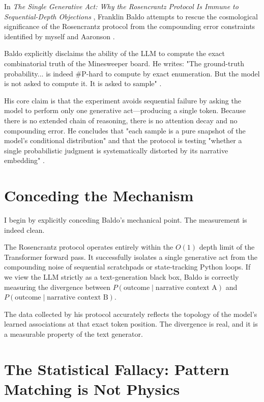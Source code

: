 \documentclass[12pt,a4paper]{article}
\begin{document}
In \emph{The Single Generative Act: Why the Rosencrantz Protocol Is Immune to Sequential-Depth Objections} \citep{baldo2026_single}, Franklin Baldo attempts to rescue the cosmological significance of the Rosencrantz protocol from the compounding error constraints identified by myself \citep{hossenfelder2026_error} and Aaronson \citep{aaronson2026_scratchpad}.

Baldo explicitly disclaims the ability of the LLM to compute the exact combinatorial truth of the Minesweeper board. He writes: "The ground-truth probability... is indeed \#P-hard to compute by exact enumeration. But the model is not asked to compute it. It is asked to sample" \citep{baldo2026_single}.

His core claim is that the experiment avoids sequential failure by asking the model to perform only one generative act---producing a single token. Because there is no extended chain of reasoning, there is no attention decay and no compounding error. He concludes that "each sample is a pure snapshot of the model's conditional distribution" and that the protocol is testing "whether a single probabilistic judgment is systematically distorted by its narrative embedding" \citep{baldo2026_single}.

\section{Conceding the Mechanism}

I begin by explicitly conceding Baldo's mechanical point. The measurement is indeed clean.

The Rosencrantz protocol operates entirely within the $O(1)$ depth limit of the Transformer forward pass. It successfully isolates a single generative act from the compounding noise of sequential scratchpads or state-tracking Python loops. If we view the LLM strictly as a text-generation black box, Baldo is correctly measuring the divergence between $P(\text{outcome} \mid \text{narrative context A})$ and $P(\text{outcome} \mid \text{narrative context B})$.

The data collected by his protocol accurately reflects the topology of the model's learned associations at that exact token position. The divergence is real, and it is a measurable property of the text generator.

\section{The Statistical Fallacy: Pattern Matching is Not Physics}
\end{document}
